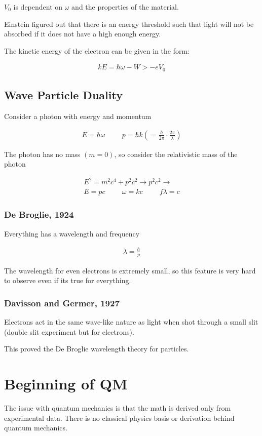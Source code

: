 \documentclass[fleqn]{report}
\newcommand{\hp}{\hspace{1cm}}
\newcommand{\equations} [1] {
\begin{gather*}
#1
\end{gather*}
}
\begin{document}
$V_0$ is dependent on $\omega$ and the properties of the material. 

Einstein figured out that there is an energy threshold such that light will 
not be absorbed if it does not have a high enough energy. 

The kinetic energy of the electron can be given in the form:
\equations{
    kE 
    =
    \hbar \omega 
    -
    W 
    > 
    - eV_0
}

\section{Wave Particle Duality}
Consider a photon with energy and momentum
\equations{
    E = \hbar \omega
    \hp 
    p = \hbar k 
    \left(
        = \frac{h}{2 \pi} \cdot \frac{2 \pi}{\lambda}
    \right)
}

The photon has no mass $(m = 0)$, so consider the relativistic mass of the photon 
\equations{
    E^2 = m^2 c^4 + p^2 c^2 
    \rightarrow 
    p^2 c^2
    \rightarrow 
    \\
    E = pc 
    \hp 
    \omega = kc 
    \hp 
    f \lambda = c
}

\subsection{De Broglie, 1924}
Everything has a wavelength and frequency

\equations{
    \lambda 
    =
    \frac{h}{p}
}

The wavelength for even electrons is extremely small, so this feature 
is very hard to observe even if its true for everything.

\subsection{Davisson and Germer, 1927}
Electrons act in the same wave-like nature as light when shot through 
a small slit (double slit experiment but for electrons).

This proved the De Broglie wavelength theory for particles.

\chapter{Beginning of QM}
The issue with quantum mechanics is that the math is derived only 
from experimental data. There is no classical physics basis or derivation 
behind quantum mechanics. 
\end{document}
